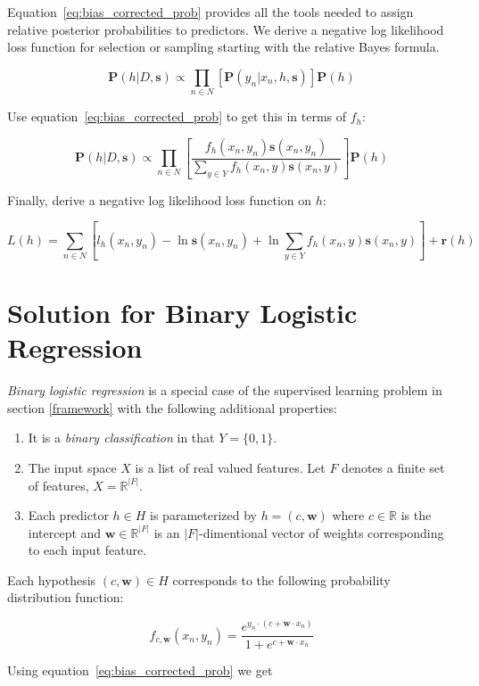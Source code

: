 \documentclass[twoside]{article}
\begin{document}
Equation~\eqref{eq:bias_corrected_prob} provides all the tools needed to assign relative posterior probabilities to predictors. We derive a negative log likelihood loss function for selection or sampling starting with the relative Bayes formula.

\[\mathbf{P}(h|D,\mathbf{s})\propto\prod_{n \in N} \left[\mathbf{P}(y_n|x_n,h,\mathbf{s})\right]\mathbf{P}(h)\]

Use equation~\eqref{eq:bias_corrected_prob} to get this in terms of \(f_h\):

\[\mathbf{P}(h|D,\mathbf{s})\propto\prod_{n \in N} \left[\frac{f_h(x_n,y_n)\mathbf{s}(x_n,y_n)}{\sum_{y \in Y}f_h(x_n,y)\mathbf{s}(x_n,y)}\right]\mathbf{P}(h)\]

Finally, derive a negative log likelihood loss function on \(h\):

\[L(h)= \sum_{n \in N} \left[l_h(x_n,y_n)-\ln\mathbf{s}(x_n,y_n)+\ln\sum_{y \in Y}f_h(x_n,y)\mathbf{s}(x_n,y) \right] +\mathbf{r}(h)\]

\section{Solution for Binary Logistic Regression}
\label{section:logistic}

\textit{Binary logistic regression} is a special case of the supervised learning problem in section \ref{framework} with the following additional properties:

\begin{enumerate}
	\item It is a \textit{binary classification} in that \(Y = \{0, 1\}\).
	\item The input space \(X\) is a list of real valued features. Let \(F\) denotes a finite set of features, \(X = \mathbb{R} ^{|F|}\).
	\item Each predictor \(h \in H\) is parameterized by \(h = (c, \mathbf{w})\) where \(c \in \mathbb{R}\) is the intercept and \(\mathbf{w} \in \mathbb{R}^{|F|}\) is an \(|F|\)-dimentional vector of weights corresponding to each input feature.
\end{enumerate}

Each hypothesis \((c, \mathbf{w}) \in H\) corresponds to the following probability distribution function:

\[f_{c,\mathbf{w}}(x_n, y_n)=\frac{e^{y_n \cdot (c+\mathbf{w} \cdot x_n)}}{1+e^{c+\mathbf{w} \cdot x_n}}\]

Using equation~\eqref{eq:bias_corrected_prob} we get
\end{document}
